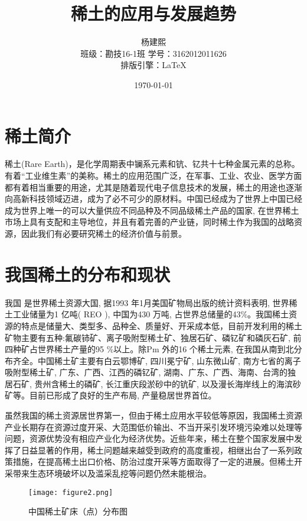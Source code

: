 \documentclass[twoside,twocolumn]{article}
\title{稀土的应用与发展趋势} %
\author{%
\textsc{杨建熙} \\%
\normalsize 班级：勘技16-1班 \qquad 学号：3162012011626 \\ %
\normalsize 排版引擎：\LaTeX{}%
}
\date{\today} %
\begin{document}
\maketitle


\section{稀土简介}
稀土(Rare Earth)，是化学周期表中镧系元素和钪、钇共十七种金属元素的总称。有着“工业维生素”的美称。稀土的应用范围广泛，在军事、工业、农业、医学方面都有着相当重要的用途，尤其是随着现代电子信息技术的发展，稀土的用途也逐渐向高新科技领域迈进，成为了必不可少的原材料。中国已经成为了世界上中国已经成为世界上唯一的可以大量供应不同品种及不同品级稀土产品的国家, 在世界稀土市场上具有支配和主导地位，并且有着完善的产业链，同时稀土作为我国的战略资源，因此我们有必要研究稀土的经济价值与前景。
\section{我国稀土的分布和现状}

\lettrine[nindent=0em,lines=2]{我}{国}
是世界稀土资源大国, 据1993 年1月美国矿物局出版的统计资料表明, 世界稀土工业储量为1 亿吨( REO ), 中国为430 万吨, 占世界总储量的43$\%$。我国稀土资源的特点是储量大、类型多、品种全、质量好、开采成本低，目前开发利用的稀土矿物主要有五种:氟碳铈矿、离子吸附型稀土矿、独居石矿、磷钇矿和磷灰石矿, 前四种矿占世界稀土产量的95 $\%$以上。除Pm 外的16 个稀土元素, 在我国从南到北分布齐全。中国稀土矿主要有白云鄂博矿, 四川冕宁矿, 山东微山矿, 南方七省的离子吸附型稀土矿, 广东、广西、江西的磷钇矿, 湖南、广东、广西、海南、台湾的独居石矿, 贵州含稀土的磷矿, 长江重庆段淤砂中的钪矿, 以及漫长海岸线上的海滨砂矿等。目前已形成了良好的生产布局, 产量稳居世界首位。\cite{RN6}

虽然我国的稀土资源居世界第一，但由于稀土应用水平较低等原因，我国稀土资源产业长期存在资源过度开采、大范围低价输出、不当开采引发环境污染难以处理等问题，资源优势没有相应产业化为经济优势。近些年来，稀土在整个国家发展中发挥了日益显著的作用，稀土问题越来越受到政府的高度重视，相继出台了一系列政策措施，在提高稀土出口价格、防治过度开采等方面取得了一定的进展。但稀土开采带来生态环境破坏以及滥采乱挖等问题仍然未能根治。
\begin{figure*}[t]
  \centering
  \texttt{[image: figure2.png]}
  \caption{中国稀土矿床（点）分布图}\cite{RN36}
\end{figure*}
\end{document}

